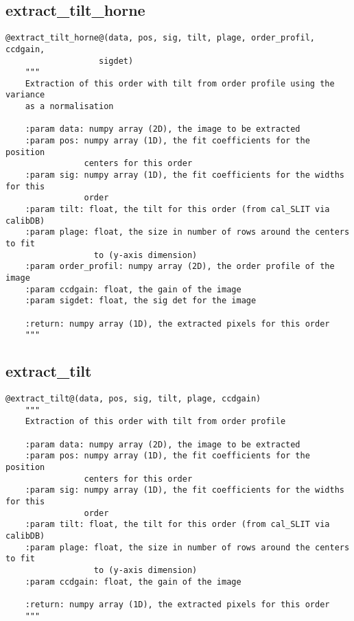 \subsection{extract\_tilt\_horne}
\begin{lstlisting}[style=pythonstyle]
@extract_tilt_horne@(data, pos, sig, tilt, plage, order_profil, ccdgain,
                   sigdet)
    """
    Extraction of this order with tilt from order profile using the variance
    as a normalisation

    :param data: numpy array (2D), the image to be extracted
    :param pos: numpy array (1D), the fit coefficients for the position
                centers for this order
    :param sig: numpy array (1D), the fit coefficients for the widths for this
                order
    :param tilt: float, the tilt for this order (from cal_SLIT via calibDB)
    :param plage: float, the size in number of rows around the centers to fit
                  to (y-axis dimension)
    :param order_profil: numpy array (2D), the order profile of the image
    :param ccdgain: float, the gain of the image
    :param sigdet: float, the sig det for the image

    :return: numpy array (1D), the extracted pixels for this order
    """
\end{lstlisting}

\subsection{extract\_tilt}
\begin{lstlisting}[style=pythonstyle]
@extract_tilt@(data, pos, sig, tilt, plage, ccdgain)
    """
    Extraction of this order with tilt from order profile

    :param data: numpy array (2D), the image to be extracted
    :param pos: numpy array (1D), the fit coefficients for the position
                centers for this order
    :param sig: numpy array (1D), the fit coefficients for the widths for this
                order
    :param tilt: float, the tilt for this order (from cal_SLIT via calibDB)
    :param plage: float, the size in number of rows around the centers to fit
                  to (y-axis dimension)
    :param ccdgain: float, the gain of the image

    :return: numpy array (1D), the extracted pixels for this order
    """
\end{lstlisting}


